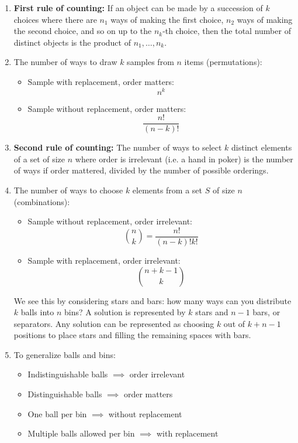 \documentclass[10pt]{article}
\begin{document}
\begin{multicols}{2}
\begin{enumerate}
        \begin{enumerate}
            \item \textbf{First rule of counting:} If an object can be made by a succession of $k$ choices where there are $n_1$ ways of making the first choice, $n_2$ ways of making the second choice, and so on up to the $n_k$-th choice, then the total number of distinct objects is the product of $n_1, \hdots, n_k$. 
            \item The number of ways to draw $k$ samples from $n$ items (permutations):
            \begin{itemize}
            \item Sample with replacement, order matters: $$n^k$$
            \item Sample without replacement, order matters: $$\frac{n!}{(n-k)!}$$
            \end{itemize}
            \item \textbf{Second rule of counting:} The number of ways to select $k$ distinct elements of a set of size $n$ where order is irrelevant (i.e. a hand in poker) is the number of ways if order mattered, divided by the number of possible orderings. 
            \item The number of ways to choose $k$ elements from a set $S$ of size $n$ (combinations):
            \begin{itemize}
            \item Sample without replacement, order irrelevant:
            $$ {n \choose k} = \frac{n!}{(n-k)!k!}$$
            \item Sample with replacement, order irrelevant:
            $$ {n+k-1 \choose k}$$ 
            \end{itemize}
            We see this by considering stars and bars: how many ways can you distribute $k$ balls into $n$ bins? A solution is represented by $k$ stars and $n-1$ bars, or separators. Any solution can be represented as choosing $k$ out of $k+n-1$ positions to place stars and filling the remaining spaces with bars.
            \item To generalize balls and bins:
            \begin{itemize}
                \item Indistinguishable balls $\implies$ order irrelevant
                \item Distinguishable balls $\implies$ order matters 
                \item One ball per bin $\implies$ without replacement
                \item Multiple balls allowed per bin $\implies$ with replacement
            \end{itemize}
             

\end{enumerate}
\end{enumerate}
\end{multicols}
\end{document}
